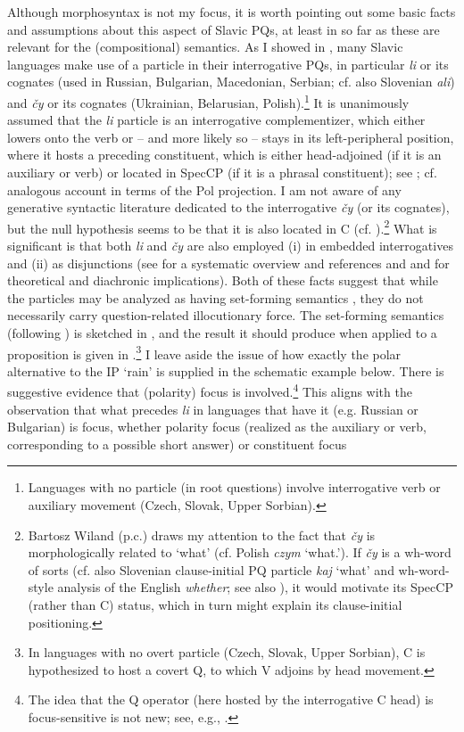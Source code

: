 \documentclass[output=paper,colorlinks,citecolor=brown]{langscibook}
\begin{document}
Although morphosyntax is not my focus, it is worth pointing out some basic facts and assumptions about this aspect of Slavic PQs, at least in so far as these are relevant for the (compositional) semantics. As I showed in , many Slavic languages make use of a particle in their interrogative PQs, in particular \textit{li} or its cognates (used in Russian, Bulgarian, Macedonian, Serbian; cf. also Slovenian \textit{ali}) and \textit{čy} or its cognates (Ukrainian, Belarusian, Polish).\footnote{Languages with no particle (in root questions) involve interrogative verb or auxiliary movement (Czech, Slovak, Upper Sorbian).} It is unanimously assumed that the \textit{li} particle is an interrogative complementizer, which either lowers onto the verb \citep{Rivero1993} or -- and more likely so -- stays in its left-peripheral position, where it hosts a preceding constituent, which is either head-adjoined (if it is an auxiliary or verb) or located in SpecCP (if it is a phrasal constituent); see \citet{Izvorski.etal1997,Rudin.etal1997,Rudin.etal1999,Schwabe2004}; cf.  analogous account in terms of the Pol projection. I am not aware of any generative syntactic literature dedicated to the interrogative \textit{čy} (or its cognates), but the null hypothesis seems to be that it is also located in C (cf. \citealt{Hansen.etal2016}).\footnote{Bartosz Wiland (p.c.) draws my attention to the fact that \textit{čy} is morphologically related to `what' (cf. Polish \textit{czym} `what.{\INS}'). If \textit{čy} is a wh-word of sorts (cf. also Slovenian clause-initial PQ particle \textit{kaj} `what' and  wh-word-style analysis of the English \textit{whether}; see also \citealt{Haegeman2012}), it would motivate its SpecCP (rather than C) status, which in turn might explain its clause-initial positioning.} What is significant is that both \textit{li} and \textit{čy} are also employed (i) in embedded interrogatives and (ii) as disjunctions (see \citealt{Logvinova2022} for a systematic overview and references and \citealt{Arsenijevic2009} and \citealt{Mitrovic2021} for theoretical and diachronic implications). Both of these facts suggest that while the particles may be analyzed as having set-forming semantics \citep{Alonso-Ovalle2006,Mitrovic2021}, they do not necessarily carry question-related illocutionary force.  The set-forming semantics (following \citealt{Alonso-Ovalle2006}) is sketched in , and the result it should produce when applied to a proposition is given in .\footnote{In languages with no overt particle (Czech, Slovak, Upper Sorbian), C is hypothesized to host a covert Q, to which V adjoins by head movement.} I leave aside the issue of how exactly the polar alternative to the IP `rain' is supplied in the schematic example below. There is suggestive evidence that (polarity) focus is involved.\footnote{The idea that the Q operator (here hosted by the interrogative C head) is focus-sensitive is not new; see, e.g., \citet{Beck2006}.} This aligns with the observation that what precedes \textit{li} in languages that have it (e.g. Russian or Bulgarian) is focus, whether polarity focus (realized as the auxiliary or verb, corresponding to a possible short answer) or constituent focus 
\end{document}
